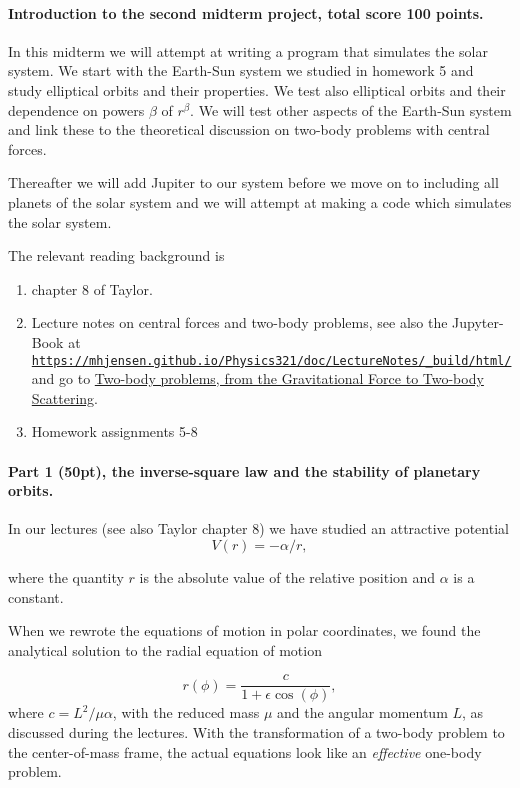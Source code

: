 \documentclass[%
oneside,                 %
final,                   %
10pt]{article}
\begin{document}
\noindent
\paragraph{Introduction to the second midterm project, total score 100 points.}
In this midterm we will attempt at writing a program that simulates
the solar system. We start with the Earth-Sun system we studied in
homework 5  and study elliptical orbits and their properties. We test
also elliptical orbits and their dependence on powers $\beta$ of
$r^{\beta}$. We will test other aspects of the Earth-Sun system and
link these to the theoretical discussion on two-body problems with
central forces. 

Thereafter we will add Jupiter to our system before we move on to including all planets of the solar system and we will
attempt at making a code which simulates the solar system.

The relevant reading background is
\begin{enumerate}
\item chapter 8 of  Taylor.

\item Lecture notes on central forces and two-body problems, see also the Jupyter-Book at \href{{https://mhjensen.github.io/Physics321/doc/LectureNotes/_build/html/}}{\nolinkurl{https://mhjensen.github.io/Physics321/doc/LectureNotes/_build/html/}} and go to \href{{https://mhjensen.github.io/Physics321/doc/LectureNotes/_build/html/chapter6.html}}{Two-body problems, from the Gravitational Force to Two-body Scattering}.

\item Homework assignments  5-8
\end{enumerate}

\noindent
\paragraph{Part 1 (50pt), the inverse-square law and the stability of planetary orbits.}
In our lectures (see also Taylor chapter 8)  we have studied an attractive potential
\[
V(r)=-\alpha/r,
\]

where the quantity $r$ is the absolute value of the relative position
and $\alpha$ is a constant.

When we rewrote the equations of motion in polar coordinates, we found the
analytical solution to the radial equation of motion 

\[
r(\phi) = \frac{c}{1+\epsilon\cos{(\phi)}},
\]
where $c=L^2/\mu\alpha$, with
the reduced mass $\mu$ and the angular momentum $L$, as
discussed during the lectures. With the transformation of a two-body
problem to the center-of-mass frame, the actual equations look like an
\emph{effective} one-body problem. 
\end{document}
